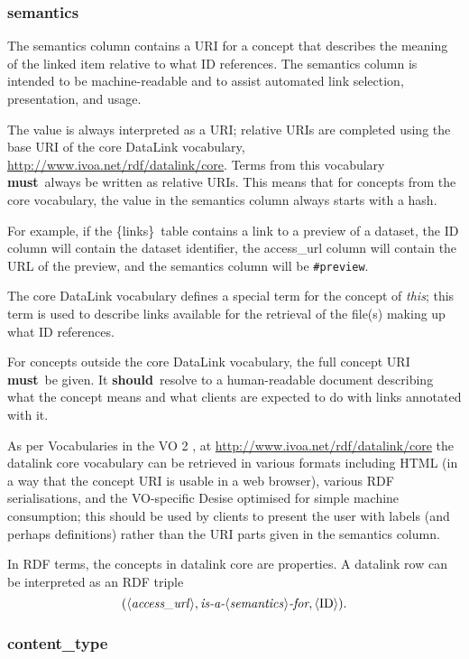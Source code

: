 \documentclass[11pt,a4paper]{ivoa}
\newcommand{\blinks}{\{links\}}
\newcommand{\rfcmust}{\textbf{must}}
\newcommand{\rfcshould}{\textbf{should}}
\begin{document}
\subsubsection{semantics}
\label{sect:semantics}

The semantics column contains a URI for a concept
that describes the meaning of the linked item relative
to what ID references. The semantics column is intended to be
machine-readable and to assist automated link selection, presentation, and
usage.

The value is always interpreted as a URI; relative URIs
\citep{std:RFC3986} are completed using the base URI of the
core DataLink vocabulary,
\url{http://www.ivoa.net/rdf/datalink/core}.  Terms from this
vocabulary \rfcmust\ always be written as relative URIs.  This means that for
concepts from the core vocabulary, the value in the semantics column
always starts with a hash.

For example, if the \blinks\ table contains a
link to a preview of a dataset, the ID column will contain the dataset
identifier, the access\_url column will contain the URL of the preview,
and the semantics column will be \verb|#preview|.

The core DataLink vocabulary defines a special term for
the concept of {\em this\/};
this term is used to describe links available for the retrieval of the
file(s) making up what ID references.

For concepts outside the core DataLink vocabulary, the full concept URI
\rfcmust\ be given.  It \rfcshould\ resolve to a human-readable document
describing what the concept means and what clients are expected to do
with links annotated with it.

As per Vocabularies in the VO 2 \citep{2021ivoa.spec.0525D}, at
\url{http://www.ivoa.net/rdf/datalink/core} the datalink core vocabulary
can be retrieved in various formats including HTML (in a way that the
concept URI is usable in a web browser), various RDF serialisations, and
the VO-specific Desise optimised for simple machine consumption; this
should be used by clients to present the user with labels (and perhaps
definitions) rather than the URI parts given in the semantics column.

In RDF terms, the concepts in datalink core are properties.  A datalink
row can be interpreted as an RDF triple
$$(
\langle\textit{access\_url\/}\rangle,
\textit{is-a-}\langle\textit{semantics\/}\rangle\textit{-for},
\langle\textrm{ID}\rangle
).$$

\subsubsection{content\_type}
\end{document}
